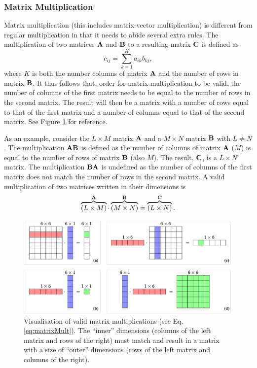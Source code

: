 \subsubsection{Matrix Multiplication}
Matrix multiplication (this includes matrix-vector multiplication) is different from regular multiplication in that it needs to abide several extra rules. The multiplication of two matrices $\mathbf{A}$ and $\mathbf{B}$ to a resulting matrix $\mathbf{C}$ is defined as
\begin{equation}\label{eq:matrixMult}
    c_{ij} = \sum_{k=1}^K a_{ik} b_{kj},
\end{equation}
where $K$ is both the number columns of matrix $\mathbf{A}$ and the number of rows in matrix $\mathbf{B}$. It thus follows that, order for matrix multiplication to be valid, the number of columns of the first matrix needs to be equal to the number of rows in the second matrix. The result will then be a matrix with a number of rows equal to that of the first matrix and a number of columns equal to that of the second matrix. See Figure \ref{fig:matrixVector} for reference.

As an example, consider the $L\times M$ matrix $
\mathbf{A}$ and a $M\times N$ matrix $\mathbf{B}$ with $L\neq N$. The multiplication $\mathbf{A}\mathbf{B}$ is defined as the number of columns of matrix $\mathbf{A}$ ($M$) is equal to the number of rows of matrix $\mathbf{B}$ (also $M$). The result, $\mathbf{C}$, is a $L \times N$ matrix. The multiplication $\mathbf{B}\mathbf{A}$ is undefined as the number of columns of the first matrix does not match the number of rows in the second matrix. A valid multiplication of two matrices written in their dimensions is
\begin{equation}
    \overbrace{(L\times M)}^{\mathbf{A}}\cdot \overbrace{(M\times N)}^{\mathbf{B}} = \overbrace{(L
    \times N)}^{\mathbf{C}}.
\end{equation}

\begin{figure}[h]
    \includegraphics[width=\textwidth]{figures/analysis/matrixVector.pdf}
    \caption{Visualisation of valid matrix multiplications (see Eq. \eqref{eq:matrixMult}). The ``inner'' dimensions (columns of the left matrix and rows of the right) must match and result in a matrix with a size of ``outer'' dimensions (rows of the left matrix and columns of the right). \label{fig:matrixVector}}
\end{figure}

